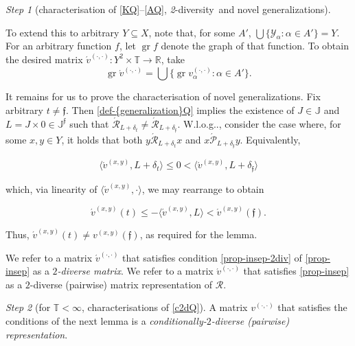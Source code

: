 \documentclass[ecta,nameyear,draft]{econsocart}
\makeatletter
\newcommand{\R}{\mathbb R}
\newcommand{\mc}{\mathcal}
\newcommand{\novel}{\mathfrak f}
\newcommand{\ext}{\mathrel{\mc R}}
\newcommand{\aext}{\mathrel{\acute{\mathrel{\mathcal R}}}}
\newcommand{\asext}{\mathrel{\acute{\mathrel{\mathcal P}}}}
\newcommand{\aextb}{\mathbin{\acute{\mathbin{\mathcal R}}}}
\newcommand{\mbbt}{{\mathds {T}}}
\newcommand{\mbbj}{\mathds J}
\newcommand{\mbbjp}{{\mathds {J}^{\novel}}}
\newcommand{\xy}{{(x, y)}}
\newcommand{\dd}{{(\cdot,\cdot)}}
\newcommand{\twodiv}{\textit{2}-\textup{diversity}}
\DeclareMathOperator{\graph}{gr}
\newcommand\Wlog{W\@.l\@.o\@.g\@ifnextchar.{}{.\@}}
\theoremstyle{plain}
\theoremstyle{remark}
\newtheorem{step}{Step}[section]
\makeatother
\begin{document}
\begin{appendix}
\begin{step}[characterisation of \ref{KQ}–\ref{AQ}, \twodiv\ and novel
    {generalization}s]
\begin{proofEnd}
    To extend this to arbitrary $Y \subseteq X$, note that, for some $A'$,
    $\bigcup\{\mc Y_\alpha : \alpha \in A' \} = Y$. For an arbitrary function
    $f$, let $\graph f$ denote the graph of that function. To obtain the
    desired matrix $\acute{v}^{\dd}: Y^2 \times \mbbt \rightarrow \R$, take
    \begin{equation}
      \graph \acute{v}^{\dd} = \bigcup \{\graph v^{\dd}_{\alpha} : \alpha \in
      A'\}.
    \end{equation}
  
    It remains for us to prove the characterisation of novel {generalization}s.
    Fix arbitrary $t \neq \novel$.  Then \cref{def-{generalization}Q} implies
    the existence of $J \in \mbbj$ and $L = J \times 0 \in \mbbjp$ such that
    $\aextb _ {L + \delta_{t}} \neq \aextb _ {L + \delta_{\novel}}$.  \Wlog,
    consider the case where, for some $x , y \in Y$, it holds that both $y
    \aext _ {L + \delta _ t} x$ and $x \asext _ {L + \delta_ \novel} y $.
    Equivalently,
    \begin{linenomath*}
      \begin{equation*}
        \langle \acute{v}^{\xy}, L + \delta_ t \rangle \leq 0 < \langle
        \acute{v}^{\xy}, L + \delta_ \novel\rangle
      \end{equation*}
    \end{linenomath*}
    which, via linearity of $\langle \acute{v}^{\xy}, \cdot \rangle$, we may
    rearrange to obtain
    \begin{linenomath*}
      \begin{equation}\label{eq-nov}
        \acute{v}^{\xy} ( t ) \leq -\langle \acute{v}^{\xy}, L \rangle <
        \acute{v}^\xy ( \novel ) .
      \end{equation}
    \end{linenomath*}
    Thus, $\acute{v}^{\xy} (t) \neq v^{\xy}(\novel)$, as required for the
    lemma.
  \end{proofEnd}
  We refer to a matrix $\acute{v}^{\dd}$ that satisfies condition
  \ref{prop-insep-2div} of \cref{prop-insep} as a \emph{$2$-diverse matrix}. We
  refer to a matrix $\acute{v}^{\dd}$ that satisfies \cref{prop-insep} as a
  $2$-diverse (pairwise) matrix representation of $\ext$.
  \end{step}
  \begin{step}[for $\mbbt<\infty$, characterisations of
    \ref{c2dQ}]\label{step-condtwodiv}
    A matrix $v^{\dd}$ that satisfies the conditions of the next lemma is a
    \emph{conditionally-$2$-diverse (pairwise) representation}.
  

\end{step}
\end{appendix}
\end{document}
